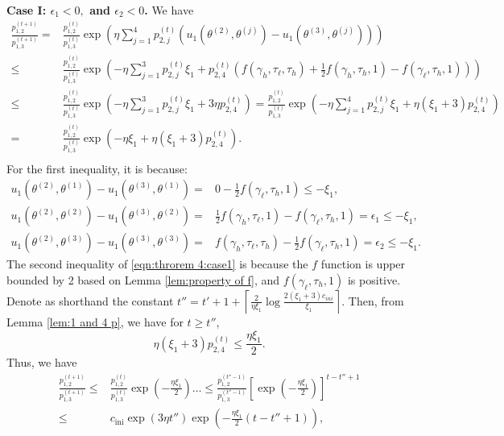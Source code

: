 \noindent \textbf{Case I: $\epsilon_1<0,$ and $\epsilon_2<0$.} We have 
\begin{equation}
    \begin{split}
    \label{eqn:throrem 4:case1}
     \frac{p^{(t+1)}_{1,2}}{p^{(t+1)}_{1,3}}  = {} &  \frac{p^{(t)}_{1,2}}{p^{(t)}_{1,3}}\exp\left(\eta \sum_{j=1}^4 p^{(t)}_{2,j}\left(u_1\left(\theta^{(2)}, \theta^{(j)}\right)-u_1\left(\theta^{(3)}, \theta^{(j)}\right)\right)\right) \\ 
     \leq  {} &  \frac{p^{(t)}_{1,2}}{p^{(t)}_{1,3}}\exp\left( -\eta \sum_{j=1}^3p^{(t)}_{2,j}\xi_1 + p^{(t)}_{2,4}\left(f(\gamma_{h},\tau_{\ell},\tau_{h})+\frac{1}{2}f(\gamma_{h},\tau_{h},1)-f(\gamma_{\ell},\tau_h,1)\right)  \right)\\
     \leq {} &  \frac{p^{(t)}_{1,2}}{p^{(t)}_{1,3}}\exp\left( -\eta \sum_{j=1}^3p^{(t)}_{2,j}\xi_1 + 3\eta p^{(t)}_{2,4}  \right)
     =  \frac{p^{(t)}_{1,2}}{p^{(t)}_{1,3}}\exp\left( -\eta \sum_{j=1}^4p^{(t)}_{2,j}\xi_1 + \eta(\xi_1+3) p^{(t)}_{2,4}  \right)\\
     = {} &  \frac{p^{(t)}_{1,2}}{p^{(t)}_{1,3}}\exp\left( -\eta\xi_1 + \eta(\xi_1+3) p^{(t)}_{2,4}  \right).\\
    \end{split}
\end{equation}
For the first inequality, it is because:
\begin{equation*}
    \begin{split}
u_1(\theta^{(2)},\theta^{(1)})-u_1(\theta^{(3)},\theta^{(1)})={} & 0-\frac{1}{2}f(\gamma_{\ell},\tau_{h},1)\leq -\xi_1,\\
u_1(\theta^{(2)},\theta^{(2)})-u_1(\theta^{(3)},\theta^{(2)})={} & \frac{1}{2}f(\gamma_{h},\tau_{\ell},1)-f(\gamma_{\ell},\tau_{h},1)=\epsilon_1\leq -\xi_1,\\
u_1(\theta^{(2)},\theta^{(3)})-u_1(\theta^{(3)},\theta^{(3)})={} &f(\gamma_{h},\tau_{\ell},\tau_{h})- \frac{1}{2}f(\gamma_{\ell},\tau_{h},1)=\epsilon_2\leq -\xi_1.
    \end{split}
\end{equation*}
The second inequality of \eqref{eqn:throrem 4:case1} is because the $f$ function is upper bounded by 2 based on Lemma \ref{lem:property of f}, and $f(\gamma_{\ell},\tau_{h},1)$ is positive. Denote as shorthand the constant $t''=t'+1+\left\lceil\frac{2}{\eta\xi_1}\log\frac{2(\xi_1+3)c_{ini}}{\xi_1}\right\rceil$.
Then, from Lemma \ref{lem:1 and 4 p}, we have for $t\geq t''$, 
$$\eta(\xi_1+3)p_{2,4}^{(t)}\leq \frac{\eta\xi_1}{2}.$$
Thus, we have  
\begin{equation*}
    \begin{split}
   \frac{p^{(t+1)}_{1,2}}{p^{(t+1)}_{1,3}} 
   \leq {} & \frac{p^{(t)}_{1,2}}{p^{(t)}_{1,3}} \exp\left(-\frac{\eta\xi_1}{2}\right) \ldots \leq \frac{p^{(t''-1)}_{1,2}}{p^{(t''-1)}_{1,3}} \left[\exp\left(-\frac{\eta\xi_1}{2}\right)\right]^{t-t''+1}\\
   \leq {} & c_{\text{ini}}\exp\left(3\eta t''\right)\exp\left(-\frac{\eta\xi_1}{2}\left(t-t''+1\right)\right),     
    \end{split}
\end{equation*}
